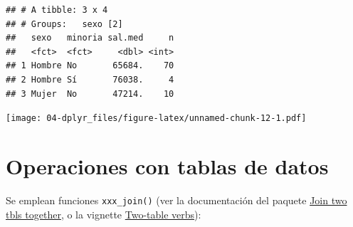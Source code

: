 \documentclass[]{book}
\newenvironment{Shaded}{\begin{snugshade}}{\end{snugshade}}
\newcommand{\KeywordTok}[1]{\textcolor[rgb]{0.13,0.29,0.53}{\textbf{#1}}}
\newcommand{\DataTypeTok}[1]{\textcolor[rgb]{0.13,0.29,0.53}{#1}}
\newcommand{\DecValTok}[1]{\textcolor[rgb]{0.00,0.00,0.81}{#1}}
\newcommand{\StringTok}[1]{\textcolor[rgb]{0.31,0.60,0.02}{#1}}
\newcommand{\OperatorTok}[1]{\textcolor[rgb]{0.81,0.36,0.00}{\textbf{#1}}}
\newcommand{\NormalTok}[1]{#1}
\begin{document}
\begin{verbatim}
## # A tibble: 3 x 4
## # Groups:   sexo [2]
##   sexo   minoria sal.med     n
##   <fct>  <fct>     <dbl> <int>
## 1 Hombre No       65684.    70
## 2 Hombre Sí       76038.     4
## 3 Mujer  No       47214.    10
\end{verbatim}

\begin{Shaded}
\end{Shaded}

\texttt{[image: 04-dplyr\_files/figure-latex/unnamed-chunk-12-1.pdf]}

\section{Operaciones con tablas de
datos}\label{operaciones-con-tablas-de-datos-1}

Se emplean funciones \texttt{xxx\_join()} (ver la documentación del
paquete \href{https://dplyr.tidyverse.org/reference/join.html}{Join two
tbls together}, o la vignette
\href{https://dplyr.tidyverse.org/articles/two-table.html}{Two-table
verbs}):
\end{document}
